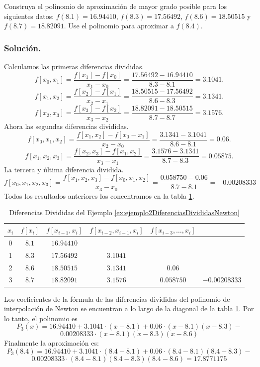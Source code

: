 \begin{exerciseT}
	Construya el polinomio de aproximación de mayor grado posible para los siguientes datos: $f(8.1)=16.94410$, $f(8.3)=17.56492$,
		$f(8.6)=18.50515$ y $f(8.7)=18.82091$. Use el polinomio para aproximar a $f(8.4)$.\\
	\subsubsection*{Solución.} 
		Calculamos las primeras diferencias divididas.
		$$f[x_0,x_1] = \dfrac{f[x_1] - f[x_0]}{x_1 - x_0} = \dfrac{17.56492-16.94410}{8.3-8.1} = 3.1041.$$
		$$f[x_1,x_2] = \dfrac{f[x_2] - f[x_1]}{x_2 - x_1} = \dfrac{18.50515-17.56492}{8.6-8.3} = 3.1341.$$
		$$f[x_2,x_3] = \dfrac{f[x_3] - f[x_2]}{x_3 - x_2} = \dfrac{18.82091-18.50515}{8.7-8.7} = 3.1576.$$
		Ahora las segundas diferencias divididas.
		$$f[x_0,x_1,x_2] = \dfrac{f[x_1,x_2] - f[x_0-x_1]}{x_2 - x_0} = \dfrac{3.1341-3.1041}{8.6-8.1} = 0.06.$$
		$$f[x_1,x_2,x_3] = \dfrac{f[x_2,x_3] - f[x_1,x_2]}{x_3 - x_1} = \dfrac{3.1576-3.1341}{8.7-8.3} = 0.05875.$$
		La tercera y última diferencia dividida.
		$$f[x_0,x_1,x_2,x_3] = \dfrac{f[x_1,x_2,x_3]-f[x_0,x_1,x_2]}{x_3-x_0} = \dfrac{0.058750-0.06}{8.7-8.1} = -0.00208333$$
	Todos los resultados anteriores los concentramos en la tabla \ref{table:ejemplo2DiferenciasDivididasNewton}.
	\begin{table}[H]
		\centering
      	\begin{tabular}{cccccc}
 			\toprule
 			$x_i$ & $f[x_i]$ & $f[x_{i-1}, x_i]$ & $f[x_{i-2},x_{i-1},x_i]$ & $f[x_{i-3},\dots,x_i]$\\ \midrule
			0 & $8.1$ & $16.94410$ & & & \\
			1 & $8.3$ & $17.56492$ & $3.1041$ &  & \\
			2 & $8.6$ & $18.50515$ & $3.1341$ & $0.06$ & \\
			3 & $8.7$ & $18.82091$ & $3.1576$ & $0.058750$ & $-0.00208333$ \\
			\bottomrule
      	\end{tabular}
      	\caption{Diferencias Divididas del Ejemplo \ref{ex:ejemplo2DiferenciasDivididasNewton}}
      	\label{table:ejemplo2DiferenciasDivididasNewton}
	\end{table}

	Los coeficientes de la fórmula de las diferencias divididas del polinomio de interpolación de Newton se encuentran a lo largo de la diagonal 
	de la tabla \ref{table:ejemplo2DiferenciasDivididasNewton}. Por lo tanto, el polinomio es
	$$P_3(x) = 16.94410 + 3.1041\cdot(x-8.1) + 0.06\cdot(x-8.1)(x-8.3) - $$
	$$0.00208333\cdot(x-8.1)(x-8.3)(x-8.6)$$	
	Finalmente la aproximación es:
	$$P_3(8.4) = 16.94410 + 3.1041\cdot(8.4-8.1) + 0.06\cdot(8.4-8.1)(8.4-8.3) - $$
	$$0.00208333\cdot(8.4-8.1)(8.4-8.3)(8.4-8.6) = 17.8771175$$
	
	\label{ex:ejemplo2DiferenciasDivididasNewton}
\end{exerciseT}

